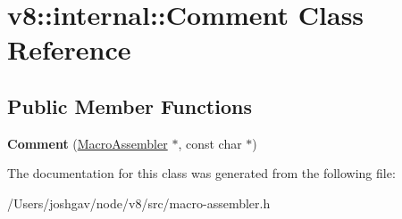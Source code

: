 \hypertarget{classv8_1_1internal_1_1_comment}{}\section{v8\+:\+:internal\+:\+:Comment Class Reference}
\label{classv8_1_1internal_1_1_comment}
\subsection*{Public Member Functions}
\begin{DoxyCompactItemize}
\item 
{\bfseries Comment} (\hyperlink{classv8_1_1internal_1_1_macro_assembler}{Macro\+Assembler} $\ast$, const char $\ast$)\hypertarget{classv8_1_1internal_1_1_comment_a16a065506583a049cfa0203da42d268e}{}\label{classv8_1_1internal_1_1_comment_a16a065506583a049cfa0203da42d268e}

\end{DoxyCompactItemize}


The documentation for this class was generated from the following file\+:\begin{DoxyCompactItemize}
\item 
/\+Users/joshgav/node/v8/src/macro-\/assembler.\+h\end{DoxyCompactItemize}
